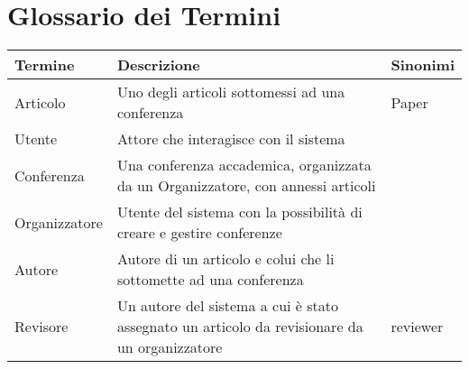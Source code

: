 \section{Glossario dei Termini}
\label{sec:glossario}
\begin{tabular}{|p{3cm}|p{6cm}|p{3cm}|}
  \hline
  \rowcolor{SkyBlue}
  Termine & Descrizione & Sinonimi \\
  \hline
  Articolo & Uno degli articoli sottomessi ad una conferenza & Paper \\
  \hline
  Utente & Attore che interagisce con il sistema & \\
  \hline
  Conferenza & Una conferenza accademica, organizzata da un Organizzatore, con annessi articoli & \\
  \hline
  Organizzatore & Utente del sistema con la possibilità di creare e gestire conferenze& \\
  \hline
  Autore & Autore di un articolo e colui che li sottomette ad una conferenza & \\
  \hline
  Revisore & Un autore del sistema a cui è stato assegnato un articolo da revisionare da un organizzatore & reviewer\\
  \hline
\end{tabular}

